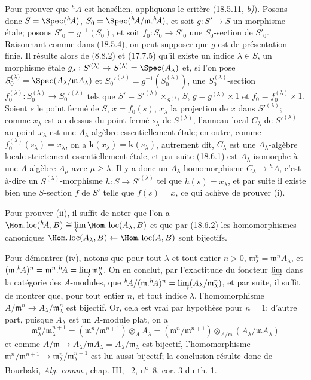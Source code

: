 Pour prouver que ${}^h\!A$ est hensélien, appliquons le critère (18.5.11, \emph{b)}). Posons donc $S=\Spec({}^h\!A)$, $S_0=\Spec({}^h\!A/\mathfrak m.{}^h\!A)$, et soit $g:S'\to S$ un morphisme étale; posons $S'_0=g^{-1}(S_0)$, et soit $f_0:S_0\to S'_0$ une $S_0$-section de $S'_0$. Raisonnant comme dans (18.5.4), on peut supposer que $g$ est de présentation finie. Il résulte alors de (8.8.2) et (17.7.5) qu'il existe un indice $\lambda\in S$, un morphisme étale $g_\lambda:S'^{(\lambda)}\to S^{(\lambda)}=\Spec(A_\lambda)$ et, si l'on pose $S_0^{(\lambda)}=\Spec(A_\lambda/\mathfrak mA_\lambda)$ et $S_0'^{(\lambda)}=g^{-1}(S_0^{(\lambda)})$, une $S_0^{(\lambda)}$-section $f_0^{(\lambda)}:S_0^{(\lambda)}\to S_0'^{(\lambda)}$ tels que $S'=S'^{(\lambda)}\times_{S^{(\lambda)}}S$, $g=g^{(\lambda)}\times1$ et $f_0=f_0^{(\lambda)}\times1$. Soient $s$ le point fermé de $S$, $x=f_0(s)$, $x_\lambda$ la projection de $x$ dans $S'^{(\lambda)}$; comme $x_\lambda$ est au-dessus du point fermé $s_\lambda$ de $S^{(\lambda)}$, l'anneau local $C_\lambda$ de $S'^{(\lambda)}$ au point $x_\lambda$ est une $A_\lambda$-algèbre essentiellement étale; en outre, comme $f_0^{(\lambda)}(s_\lambda)=x_\lambda$, on a $\boldsymbol{k}(x_\lambda)=\boldsymbol{k}(s_\lambda)$, autrement dit, $C_\lambda$ est une $A_\lambda$-algèbre locale strictement essentiellement étale, et par suite (18.6.1) est $A_\lambda$-isomorphe à une $A$-algèbre $A_\mu$ avec $\mu\geq\lambda$. Il y a donc un $A_\lambda$-homomorphisme $C_\lambda\to{}^h\!A$, c'est-à-dire un $S^{(\lambda)}$-morphisme $h:S\to S'^{(\lambda)}$ tel que $h(s)=x_\lambda$, et par suite il existe bien une $S$-section $f$ de $S'$ telle que $f(s)=x$, ce qui achève de prouver (i).

Pour prouver (ii), il suffit de noter que l'on a $\Hom.\operatorname{loc}({}^h\!A,B)\cong\varprojlim\Hom.\operatorname{loc}(A_\lambda,B)$ et que par (18.6.2) les homomorphismes canoniques $\Hom.\operatorname{loc}(A_\lambda,B)\leftarrow\Hom.\operatorname{loc}(A,B)$ sont bijectifs.

Pour démontrer (iv), notons que pour tout $\lambda$ et tout entier $n>0$, $\mathfrak m_\lambda^n=\mathfrak m^nA_\lambda$, et $(\mathfrak m.{}^h\!A)^n=\mathfrak m^n.{}^h\!A=\varinjlim\mathfrak m_\lambda^n$. On en conclut, par l'exactitude du foncteur $\varinjlim$ dans la catégorie des $A$-modules, que ${}^h\!A/(\mathfrak m.{}^h\!A)^n=\varinjlim(A_\lambda/\mathfrak m_\lambda^n)$, et par suite, il suffit de montrer que, pour tout entier $n$, et tout indice $\lambda$, l'homomorphisme $A/\mathfrak m^n\to A_\lambda/\mathfrak m_\lambda^n$ est bijectif. Or, cela est vrai par hypothèse pour $n=1$; d'autre part, puisque $A_\lambda$ est un $A$-module plat, on a
\[
  \mathfrak m_\lambda^n/\mathfrak m_\lambda^{n+1}
  =(\mathfrak m^n/\mathfrak m^{n+1})\otimes_A A_\lambda
  =(\mathfrak m^n/\mathfrak m^{n+1})\otimes_{A/\mathfrak m}(A_\lambda/\mathfrak mA_\lambda)
\]
et comme $A/\mathfrak m\to A_\lambda/\mathfrak mA_\lambda=A_\lambda/\mathfrak m_\lambda$ est bijectif, l'homomorphisme $\mathfrak m^n/\mathfrak m^{n+1}\to\mathfrak m_\lambda^n/\mathfrak m_\lambda^{n+1}$ est lui aussi bijectif; la conclusion résulte donc de Bourbaki, \emph{Alg. comm.}, chap. III, \textsection~2, n\textsuperscript{o}~8, cor. 3 du th. 1.

